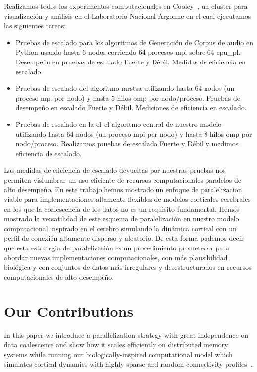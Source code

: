 {Realizamos todos los experimentos computacionales en Cooley~\cite{noauthor_cooley_nodate}, un cluster para visualización y análisis en el Laboratorio Nacional Argonne en el cual ejecutamos las siguientes tareas: 
\begin{itemize}
\item Pruebas de escalado para los algoritmos de Generación de Corpus de audio en Python usando hasta 6 nodos corriendo 64 procesos \gls{mpi} sobre 64 \gls{cpu_pl}.
Desempeño en pruebas de escalado Fuerte y Débil. Medidas de eficiencia en escalado.
\item Pruebas de escalado del algoritmo \gls{mrstsa} utilizando hasta 64 nodos (un proceso \gls{mpi} por nodo) y hasta 5 hilos \gls{omp} por nodo/proceso.
Pruebas de desempeño en escalado Fuerte y Débil. Mediciones de eficiencia en escalado. 
\item Pruebas de escalado en la \gls{el}--el algoritmo central de nuestro modelo--utilizando hasta 64 nodos (un proceso \gls{mpi} por nodo) y hasta 8 hilos \gls{omp} por nodo/proceso. Realizamos pruebas de escalado Fuerte y Débil y medimos eficiencia de escalado.
\end{itemize}

Las medidas de eficiencia de escalado devueltas por nuestras pruebas nos permiten vislumbrar un uso eficiente de recursos computacionales paralelos de alto desempeño.
En este trabajo hemos mostrado un enfoque de paralelización viable para implementaciones altamente flexibles de modelos corticales cerebrales en los que la coalescencia de los datos no es un requisito fundamental.
Hemos mostrado la versatilidad de este esquema de paralelización en nuestro modelo computacional inspirado en el cerebro simulando la dinámica cortical con un perfil de conexión altamente disperso y aleatorio.
De esta forma podemos decir que esta estrategia de paralelización es un procedimiento prometedor para abordar nuevas implementaciones computacionales, con más plausibilidad biológica y con conjuntos de datos más irregulares y desestructurados en recursos computacionales de alto desempeño.
}{
\section{Our Contributions}

In this paper we introduce a parallelization strategy with great independence on data coalescence and show how it scales efficiently on distributed memory systems while running our biologically-inspired computational model which simulates cortical dynamics with highly sparse and random connectivity profiles~\cite{10.1371/journal.pone.0217966}.

}
